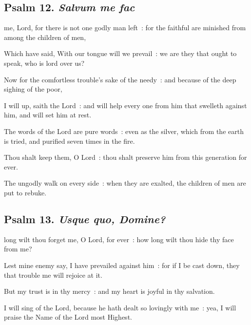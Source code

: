 \subsection{Psalm 12. \textit{Salvum me fac}}


 me, Lord, for there is not one godly man left~: for the faithful are minished from among the children of men,\par
{}
Which have said, With our tongue will we prevail~: we are they that ought to speak, who is lord over us?\par
{}Now for the comfortless trouble's sake of the needy~: and because of the deep sighing of the poor,\par
{}I will up, saith the Lord~: and will help every one from him that swelleth against him, and will set him at rest.\par
{}The words of the Lord are pure words~: even as the silver, which from the earth is tried, and purified seven times in the fire.\par
{}Thou shalt keep them, O Lord~: thou shalt preserve him from this generation for ever.\par
{}The ungodly walk on every side~: when they are exalted, the children of men are put to rebuke.\par

\subsection{Psalm 13. \textit{Usque quo, Domine?}}


 long wilt thou forget me, O Lord, for ever~: how long wilt thou hide thy face from me?\par
{}
Lest mine enemy say, I have prevailed against him~: for if I be cast down, they that trouble me will rejoice at it.\par
{}But my trust is in thy mercy~: and my heart is joyful in thy salvation.\par
{}I will sing of the Lord, because he hath dealt so lovingly with me~: yea, I will praise the Name of the Lord most Highest.\par


